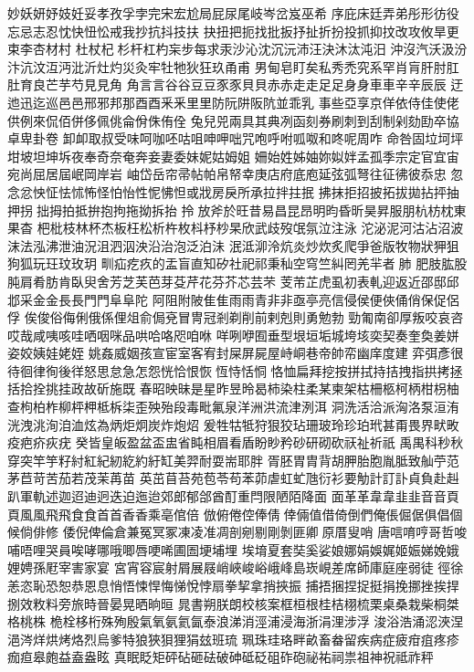 妙妖妍妤妓妊妥孝孜孚孛完宋宏尬局屁尿尾岐岑岔岌巫希
序庇床廷弄弟彤形彷役忘忌志忍忱快忸忪戒我抄抗抖技扶
抉扭把扼找批扳抒扯折扮投抓抑抆改攻攸旱更束李杏材村
杜杖杞杉杆杠杓杗步每求汞沙沁沈沉沅沛汪決沐汰沌汨
沖沒汽沃汲汾汴沆汶沍沔沘沂灶灼災灸牢牡牠狄狂玖甬甫
男甸皂盯矣私秀禿究系罕肖肓肝肘肛肚育良芒芋芍見⾒角
⾓言⾔谷⾕豆⾖豕⾗貝⾙赤⾚走⾛足⾜身⾝車⾞辛⾟辰⾠
迂迆迅迄巡⾢邑邢邪邦那酉⾣釆⾤里⾥防阮阱阪阬並乖乳
事些亞享京佯依侍佳使佬供例來侃佰併侈佩佻侖佾侏侑佺
兔兒兕兩具其典冽函刻券刷刺到刮制剁劾劻卒協卓卑卦卷
卸卹取叔受味呵咖呸咕咀呻呷咄咒咆呼咐呱呶和咚呢周咋
命咎固垃坷坪坩坡坦坤坼夜奉奇奈奄奔妾妻委妹妮姑姆姐
姍始姓姊妯妳姒姅孟孤季宗定官宜宙宛尚屈居屆岷岡岸岩
岫岱岳帘帚帖帕帛帑幸庚店府底庖延弦弧弩往征彿彼忝忠
忽念忿怏怔怯怵怖怪怕怡性怩怫怛或戕房戾所承拉拌拄抿
拂抹拒招披拓拔拋拈抨抽押拐拙拇拍抵拚抱拘拖拗拆抬
拎放斧於旺昔易昌昆昂明昀昏昕昊昇服朋杭枋枕東果杳
杷枇枝林杯杰板枉松析杵枚枓杼杪杲欣武歧歿氓氛泣注泳
沱泌泥河沽沾沼波沫法泓沸泄油況沮泗泅泱沿治泡泛泊沬
泯泜泖泠炕炎炒炊炙爬爭爸版牧物狀狎狙狗狐玩玨玟玫玥
甽疝疙疚的盂盲直知矽社祀祁秉秈空穹竺糾罔羌羋者肺
肥肢肱股肫肩肴肪肯臥臾舍芳芝芙芭芽芟芹花芬芥芯芸芣
芰芾芷虎虱初表軋迎返近邵邸邱邶采金⾦長⾧門⾨阜⾩陀
阿阻附陂隹⾫雨⾬青⾮非亟亭亮信侵侯便俠俑俏保促侶俘
俟俊俗侮俐俄係俚俎俞侷兗冒冑冠剎剃削前剌剋則勇勉勃
勁匍南卻厚叛咬哀咨哎哉咸咦咳哇哂咽咪品哄哈咯咫咱咻
咩咧咿囿垂型垠垣垢城垮垓奕契奏奎奐姜姘姿姣姨娃姥姪
姚姦威姻孩宣宦室客宥封屎屏屍屋峙峒巷帝帥帟幽庠度建
弈弭彥很待徊律徇後徉怒思怠急怎怨恍恰恨恢恆恃恬恫
恪恤扁拜挖按拼拭持拮拽指拱拷拯括拾拴挑挂政故斫施既
春昭映昧是星昨昱昤曷柿染柱柔某柬架枯柵柩柯柄柑枴柚
查枸柏柞柳枰柙柢柝柒歪殃殆段毒毗氟泉洋洲洪流津洌洱
洞洗活洽派洶洛泵洹洧洸洩洮洵洎洫炫為炳炬炯炭炸炮炤
爰牲牯牴狩狠狡玷珊玻玲珍珀玳甚甭畏界畎畋疫疤疥疢疣
癸皆皇皈盈盆盃盅省盹相眉看盾盼眇矜砂研砌砍祆祉祈祇
禹禺科秒秋穿突竿竽籽紂紅紀紉紇約紆缸美羿耐耍耑耶胖
胥胚胃胄背胡胛胎胞胤胝致舢苧范茅苣苛苦茄若茂茉苒苗
英茁苜苔苑苞苓苟苯茆虐虹虻虺衍衫要觔計訂訃貞負赴赳
趴軍軌述迦迢迪迥迭迫迤迨郊郎郁郃酋酊重閂限陋陌降面
⾯革⾰韋⾱韭⾲音⾳頁⾴風⾵飛⾶食⾷首⾸香⾹乘亳倌倍
倣俯倦倥俸倩倖倆值借倚倒們俺倀倔倨俱倡個候倘俳修
倭倪俾倫倉兼冤冥冢凍凌准凋剖剜剔剛剝匪卿原厝叟哨
唐唁唷哼哥哲唆哺唔哩哭員唉哮哪哦唧唇哽唏圃圄埂埔埋
埃堉夏套奘奚娑娘娜娟娛娓姬娠娣娩娥娌娉孫屘宰害家宴
宮宵容宸射屑展屐峭峽峻峪峨峰島崁峴差席師庫庭座弱徒
徑徐恙恣恥恐恕恭恩息悄悟悚悍悔悌悅悖扇拳挈拿捎挾振
捕捂捆捏捉挺捐挽挪挫挨捍捌效敉料旁旅時晉晏晃晒晌晅
晁書朔朕朗校核案框桓根桂桔栩梳栗桌桑栽柴桐桀格桃株
桅栓栘桁殊殉殷氣氧氨氦氤泰浪涕消涇浦浸海浙涓浬涉浮
浚浴浩涌涊浹涅浥涔烊烘烤烙烈烏爹特狼狹狽狸狷玆班琉
珮珠珪珞畔畝畜畚留疾病症疲疳疽疼疹痂疸皋皰益盍盎眩
真眠眨矩砰砧砸砝破砷砥砭砠砟砲祕祐祠祟祖神祝祗祚秤
